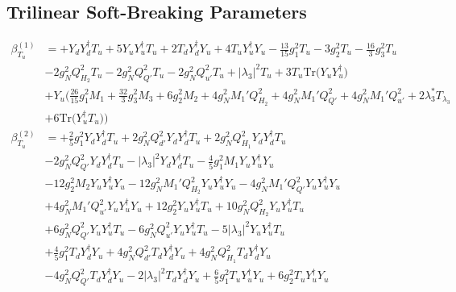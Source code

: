 \subsection{Trilinear Soft-Breaking Parameters}
{\allowdisplaybreaks  \begin{align} 
\beta_{T_u}^{(1)} & =  
+{Y_d  Y_{d}^{\dagger}  T_u}+5 {Y_u  Y_{u}^{\dagger}  T_u} +2 {T_d  Y_{d}^{\dagger}  Y_u} +4 {T_u  Y_{u}^{\dagger}  Y_u} -\frac{13}{15} g_{1}^{2} T_u -3 g_{2}^{2} T_u -\frac{16}{3} g_{3}^{2} T_u \nonumber \\ 
 &-2 g_{N}^{2} Q_{H_2}^{2} T_u -2 g_{N}^{2} Q_{Q'}^{2} T_u -2 g_{N}^{2} Q_{u'}^{2} T_u +|\lambda_3|^2 T_u +3 T_u \mbox{Tr}\Big({Y_u  Y_{u}^{\dagger}}\Big) \nonumber \\ 
 &+Y_u \Big(\frac{26}{15} g_{1}^{2} M_1 +\frac{32}{3} g_{3}^{2} M_3 +6 g_{2}^{2} M_2 +4 g_{N}^{2} M_1' Q_{H_2}^{2} +4 g_{N}^{2} M_1' Q_{Q'}^{2} +4 g_{N}^{2} M_1' Q_{u'}^{2} +2 \lambda_3^* T_{\lambda_3} \nonumber \\ 
 &+6 \mbox{Tr}\Big({Y_{u}^{\dagger}  T_u}\Big) \Big)\\ 
\beta_{T_u}^{(2)} & =  
+\frac{2}{5} g_{1}^{2} {Y_d  Y_{d}^{\dagger}  T_u} +2 g_{N}^{2} Q_{d'}^{2} {Y_d  Y_{d}^{\dagger}  T_u} +2 g_{N}^{2} Q_{H_1}^{2} {Y_d  Y_{d}^{\dagger}  T_u} \nonumber \\ 
 &-2 g_{N}^{2} Q_{Q'}^{2} {Y_d  Y_{d}^{\dagger}  T_u} - |\lambda_3|^2 {Y_d  Y_{d}^{\dagger}  T_u} -\frac{4}{5} g_{1}^{2} M_1 {Y_u  Y_{u}^{\dagger}  Y_u} \nonumber \\ 
 &-12 g_{2}^{2} M_2 {Y_u  Y_{u}^{\dagger}  Y_u} -12 g_{N}^{2} M_1' Q_{H_2}^{2} {Y_u  Y_{u}^{\dagger}  Y_u} -4 g_{N}^{2} M_1' Q_{Q'}^{2} {Y_u  Y_{u}^{\dagger}  Y_u} \nonumber \\ 
 &+4 g_{N}^{2} M_1' Q_{u'}^{2} {Y_u  Y_{u}^{\dagger}  Y_u} +12 g_{2}^{2} {Y_u  Y_{u}^{\dagger}  T_u} +10 g_{N}^{2} Q_{H_2}^{2} {Y_u  Y_{u}^{\dagger}  T_u} \nonumber \\ 
 &+6 g_{N}^{2} Q_{Q'}^{2} {Y_u  Y_{u}^{\dagger}  T_u} -6 g_{N}^{2} Q_{u'}^{2} {Y_u  Y_{u}^{\dagger}  T_u} -5 |\lambda_3|^2 {Y_u  Y_{u}^{\dagger}  T_u} \nonumber \\ 
 &+\frac{4}{5} g_{1}^{2} {T_d  Y_{d}^{\dagger}  Y_u} +4 g_{N}^{2} Q_{d'}^{2} {T_d  Y_{d}^{\dagger}  Y_u} +4 g_{N}^{2} Q_{H_1}^{2} {T_d  Y_{d}^{\dagger}  Y_u} \nonumber \\ 
 &-4 g_{N}^{2} Q_{Q'}^{2} {T_d  Y_{d}^{\dagger}  Y_u} -2 |\lambda_3|^2 {T_d  Y_{d}^{\dagger}  Y_u} +\frac{6}{5} g_{1}^{2} {T_u  Y_{u}^{\dagger}  Y_u} +6 g_{2}^{2} {T_u  Y_{u}^{\dagger}  Y_u} \nonumber \\ 

\end{align}}
